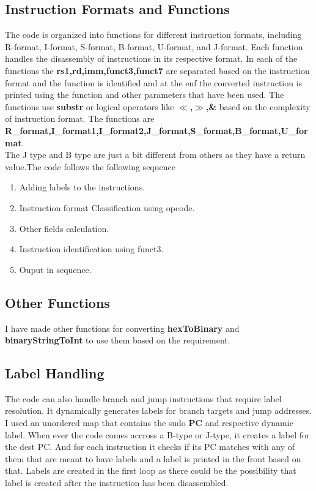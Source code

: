 \documentclass{article}
\begin{document}
\subsection{Instruction Formats and Functions}
The code is organized into functions for different instruction formats, including R-format, I-format, S-format, B-format, U-format, and J-format. Each function handles the disassembly of instructions in its respective format. In each of the functions the \textbf{rs1,rd,imm,funct3,funct7} are separated based on the instruction format and the function is identified and at the enf the converted instruction is printed using the function and other parameters that have been used. The functions use \textbf{substr} or logical operators like \textbf{$\ll$,$\gg$,\&} based on the complexity of instruction format. The functions are \textbf{R\_format,I\_format1,I\_format2,J\_format,S\_format,B\_format,U\_format}.\\The J type and B type are just a bit different from others as they have a return value.The code follows the following sequence
\begin{enumerate}
\item Adding labels to the instructions.
\item Instruction format Classification using opcode.
\item Other fields calculation.
\item Instruction identification using funct3.
\item Ouput in sequence.
\end{enumerate}
\subsection{Other Functions}
I have made other functions for converting \textbf{hexToBinary} and \textbf{binaryStringToInt} to use them based on the requirement.

\subsection{Label Handling}
The code can also handle branch and jump instructions that require label resolution. It dynamically generates labels for branch targets and jump addresses. I used an unordered map that contains the sudo \textbf{PC} and respective dynamic label. When ever the code comes accross a B-type or J-type, it creates a label for the dest PC. And for each instruction it checks if its PC matches with any of them that are meant to have labels and a label is printed in the front based on that. Labels are created in the first loop as there could be the possibility that label is created after the instruction has been disassembled.
\end{document}
